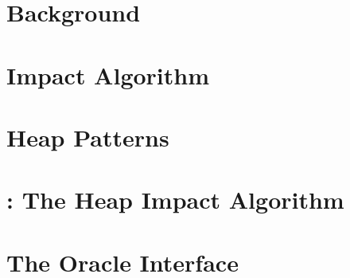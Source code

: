 \documentclass[12pt, letterpaper]{report}
\begin{document}
\chapter{Background}


\chapter{Impact Algorithm}


\chapter{Heap Patterns}


\chapter{\verifier: The Heap Impact Algorithm}


\chapter{The Oracle Interface}


% 

% 

% 

% 

% 

% 


\small

\end{document}
